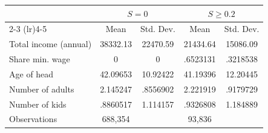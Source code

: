 \begin{tabular}{lcccc}
\toprule
 & \multicolumn{2}{c}{$S=0$} & \multicolumn{2}{c}{$S\geq 0.2$} \\
\cmidrule(lr){2-3} \cmidrule(lr){4-5}
 & Mean & Std. Dev. & Mean & Std. Dev. \\
\midrule
Total income (annual) & 38332.13 & 22470.59 & 21434.64 & 15086.09 \\
Share min. wage & 0 & 0 & .6523131 & .3218538 \\
Age of head & 42.09653 & 10.92422 & 41.19396 & 12.20445 \\
Number of adults & 2.145247 & .8556902 & 2.221919 & .9179729 \\
Number of kids & .8860517 & 1.114157 & .9326808 & 1.184889 \\
\midrule
Observations & 688,354 & & 93,836 & \\
\bottomrule
\end{tabular}
